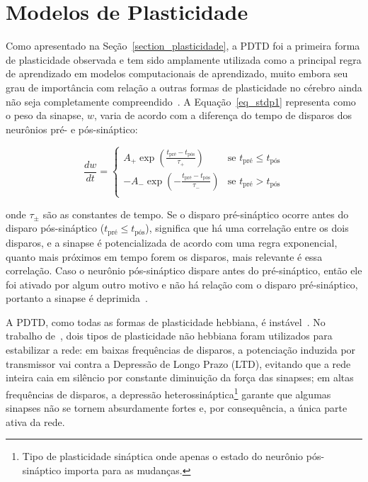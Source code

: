 \section{Modelos de Plasticidade}\label{section_modelos_plasticidade} 

Como apresentado na Seção~\ref{section_plasticidade}, a PDTD foi a primeira forma de plasticidade observada e tem sido amplamente
utilizada como a principal regra de aprendizado em modelos computacionais de aprendizado, muito embora seu grau de importância com
relação a outras formas de plasticidade no cérebro ainda não seja completamente compreendido~\cite{feldmanSpike2020}. A
Equação~\ref{eq_stdp1} representa como o peso da sinapse, $w$, varia de acordo com a diferença do tempo de disparos dos neurônios
pré- e pós-sináptico:

\begin{equation}
\label{eq_stdp1}
\frac{dw}{dt} = 
\begin{cases}
      A_{+} \exp(\frac{t_{\text{pré}} - t_{\text{pós}}}{\tau_{+}}) & \text{se $t_{\text{pré}} \le t_{\text{pós}}$}\\
      -A_{-} \exp(-\frac{t_{\text{pré}} - t_{\text{pós}}}{\tau_{-}}) & \text{se $t_{\text{pré}} > t_{\text{pós}}$}\\
\end{cases}
\end{equation}

\noindent{}onde $\tau_{\pm}$ são as constantes de tempo. Se o disparo pré-sináptico ocorre antes do disparo pós-sináptico ($t_{\text{pré}}
\le t_{\text{pós}}$), significa que há uma correlação entre os dois disparos, e a sinapse é potencializada de acordo com uma regra
exponencial, quanto mais próximos em tempo forem os disparos, mais relevante é essa correlação. Caso o neurônio pós-sináptico
dispare antes do pré-sináptico, então ele foi ativado por algum outro motivo e não há relação com o disparo pré-sináptico,
portanto a sinapse é deprimida~\cite{yamazakiSpiking2022}.

A PDTD, como todas as formas de plasticidade hebbiana, é instável~\cite{gerstnerSpiking2002}. No trabalho
de~\cite{zenkeDiverse2015}, dois tipos de plasticidade não hebbiana foram utilizados para estabilizar a rede: em baixas
frequências de disparos, a potenciação induzida por transmissor vai contra a Depressão de Longo Prazo (LTD), evitando que a rede
inteira caia em silêncio por constante diminuição da força das sinapses; em altas frequências de disparos, a depressão
heterossináptica\footnote{Tipo de plasticidade sináptica onde apenas o estado do neurônio pós-sináptico importa para as mudanças.}
garante que algumas sinapses não se tornem absurdamente fortes e, por consequência, a única parte ativa da rede.

